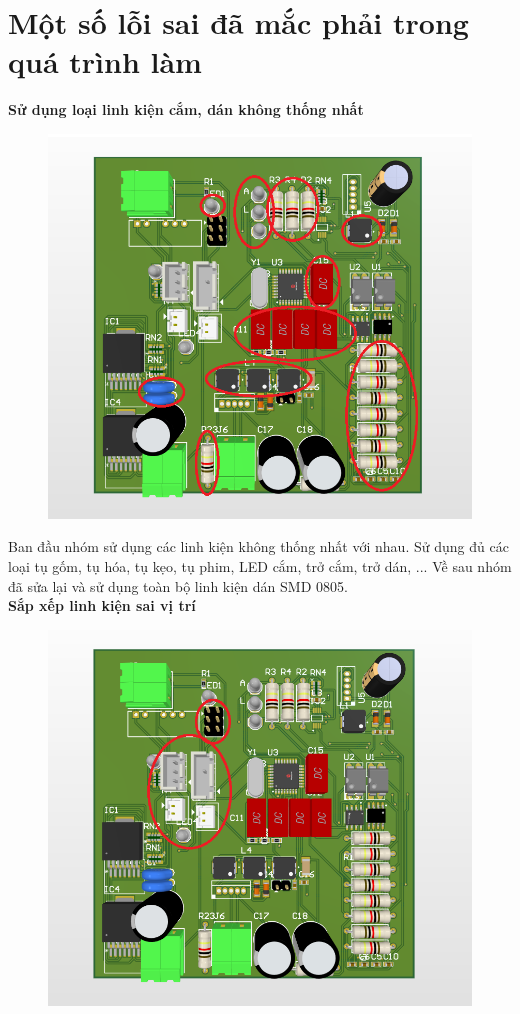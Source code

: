 \section{Một số lỗi sai đã mắc phải trong quá trình làm}
\textbf{Sử dụng loại linh kiện cắm, dán không thống nhất}
\begin{figure}[H]
    \centering
    \includegraphics[width=1\textwidth]{pictures/7n.png}
\end{figure}
Ban đầu nhóm sử dụng các linh kiện không thống nhất với nhau. Sử dụng đủ các loại tụ gốm, tụ hóa, tụ kẹo, tụ phim, LED cắm, trở cắm, trở dán, ... Về sau nhóm đã sửa lại và sử dụng toàn bộ linh kiện dán SMD 0805. \\
\cleardoublepage
\textbf{Sắp xếp linh kiện sai vị trí}
\begin{figure}[H]
    \centering
    \includegraphics[width=1\textwidth]{pictures/7o.png}
\end{figure}
